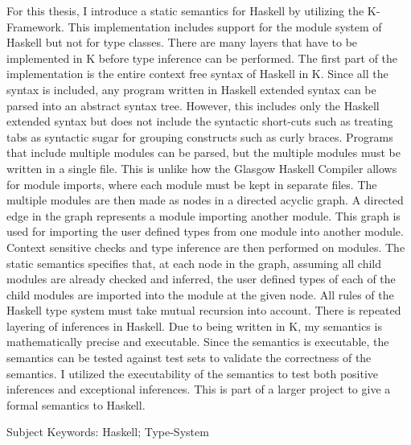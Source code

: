 For this thesis, I introduce a static semantics for Haskell by utilizing the K-Framework. This implementation includes support for the module system of Haskell but not for type classes. There are many layers that have to be implemented in K before type inference can be performed. The first part of the implementation is the entire context free syntax of Haskell in K. Since all the syntax is included, any program written in Haskell extended syntax can be parsed into an abstract syntax tree. However, this includes only the Haskell extended syntax
but does not include the syntactic short-cuts such as treating tabs as syntactic sugar for grouping constructs such as curly braces. Programs that include multiple modules can be parsed, but the multiple modules must be written in a single file. This is unlike how the Glasgow Haskell Compiler allows for module imports, where each module must be kept in separate files. The multiple modules are then made as nodes in a directed acyclic graph. A directed edge in the graph represents a module importing another module. This graph is used for importing the user defined types from one module into another module. Context sensitive checks and type inference are then performed on modules. The static semantics specifies that, at each node in the graph, assuming all child modules are already checked and inferred, the user defined types of each of the child modules are imported into the module at the given node. All rules of the Haskell type system must take mutual recursion into account. There is repeated layering of inferences in Haskell. Due to being written in K, my semantics is mathematically precise and executable. Since the semantics is executable, the semantics can be tested against test sets to validate the correctness of the semantics. I utilized the executability of the semantics to test both positive inferences and exceptional inferences. This is part of a larger project to give a formal semantics to Haskell.

Subject Keywords: Haskell; Type-System
